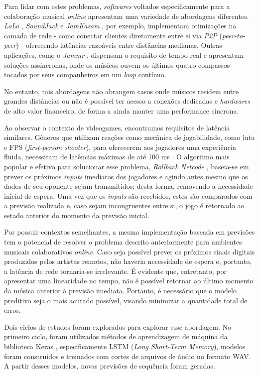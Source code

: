 Para lidar com estes problemas, \textit{softwares} voltados especificamente para a colaboração musical \textit{online} apresentam uma variedade de abordagens diferentes. \textit{LoLa} \cite{lola}, \textit{SoundJack} \cite{soundjack} e \textit{JamKazam} \cite{jamkazam}, por exemplo, implementam otimizações na camada de rede - como conectar clientes diretamente entre si via \textit{P2P} (\textit{peer-to-peer}) - oferecendo latências razoáveis entre distâncias medianas. Outras aplicações, como o \textit{Jammr} \cite{jammr}, dispensam o requisito de tempo real e apresentam soluções assíncronas, onde os músicos ouvem os últimos quatro compassos tocados por seus companheiros em um \textit{loop} contínuo.

No entanto, tais abordagens não abrangem casos onde músicos residem entre grandes distâncias ou não é possível ter acesso a conexões dedicadas e \textit{hardwares} de alto valor financeiro, de forma a ainda manter uma performance síncrona.

Ao observar o contexto de videogames, encontramos requisitos de latência similares. Gêneros que utilizam reações como mecânica de jogabilidade, como luta e FPS (\textit{first-person shooter}), para oferecerem aos jogadores uma experiência fluida, necessitam de latências máximas de até 100 ms \cite{pubnub}. O algoritmo mais popular e efetivo para solucionar esse problema, \textit{Rollback Netcode} \cite{rollback}, baseia-se em prever os próximos \textit{inputs} imediatos dos jogadores e agindo antes mesmo que os dados de seu oponente sejam transmitidos; desta forma, removendo a necessidade inicial de espera. Uma vez que os \textit{inputs} são recebidos, estes são comparados com a previsão realizada e, caso sejam incongruentes entre si, o jogo é retornado ao estado anterior do momento da previsão inicial.

Por possuir contextos semelhantes, a mesma implementação baseada em previsões tem o potencial de resolver o problema descrito anteriormente para ambientes musicais colaborativos \textit{online}. Caso seja possível prever os próximos sinais digitais produzidos pelos artistas remotos, não haveria necessidade de espera e, portanto, a latência de rede tornaria-se irrelevante. É evidente que, entretanto, por apresentar uma linearidade no tempo, não é possível retornar ao último momento da música anterior à previsão imediata. Portanto, é necessário que o modelo preditivo seja o mais acurado possível, visando minimizar a quantidade total de erros.

Dois ciclos de estudos foram explorados para explorar esse abordagem. No primeiro ciclo, foram utilizados métodos de aprendizagem de máquina da biblioteca Keras \cite{keras}, especificamente LSTM (\textit{Long Short-Term Memory})\cite{lstm}, modelos foram construídos e treinados com cortes de arquivos de áudio no formato WAV. A partir desses modelos, novas previsões de sequência foram geradas.

